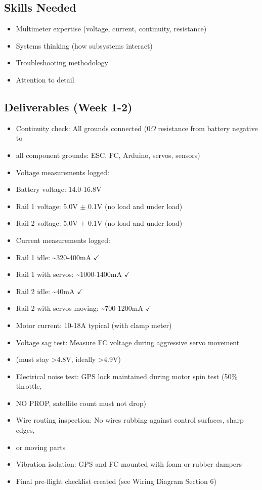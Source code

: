 \documentclass[11pt,letterpaper]{article}
\begin{document}
{\subsection{Skills Needed}

\begin{itemize}
  \item Multimeter expertise (voltage, current, continuity, resistance)
  \item Systems thinking (how subsystems interact)
  \item Troubleshooting methodology
  \item Attention to detail
\end{itemize}

\subsection{Deliverables (Week 1-2)}

\begin{itemize}
  \item Continuity check: All grounds connected (0$\Omega$ resistance from battery negative to
  \item all component grounds: ESC, FC, Arduino, servos, sensors)
  \item Voltage measurements logged:
  \item Battery voltage: 14.0-16.8V
  \item Rail 1 voltage: 5.0V $\pm$ 0.1V (no load and under load)
  \item Rail 2 voltage: 5.0V $\pm$ 0.1V (no load and under load)
  \item Current measurements logged:
  \item Rail 1 idle: \textasciitilde{}320-400mA $\checkmark$
  \item Rail 1 with servos: \textasciitilde{}1000-1400mA $\checkmark$
  \item Rail 2 idle: \textasciitilde{}40mA $\checkmark$
  \item Rail 2 with servos moving: \textasciitilde{}700-1200mA $\checkmark$
  \item Motor current: 10-18A typical (with clamp meter)
  \item Voltage sag test: Measure FC voltage during aggressive servo movement
  \item (must stay >4.8V, ideally >4.9V)
  \item Electrical noise test: GPS lock maintained during motor spin test (50\% throttle,
  \item NO PROP, satellite count must not drop)
  \item Wire routing inspection: No wires rubbing against control surfaces, sharp edges,
  \item or moving parts
  \item Vibration isolation: GPS and FC mounted with foam or rubber dampers
  \item Final pre-flight checklist created (see Wiring Diagram Section 6)
\end{itemize}

}
\end{document}
